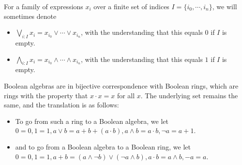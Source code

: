 \begin{remark}
  For a family of expressions $x_i$ over a 
  finite set of indices $I = \{i_0, \cdots, i_n\}$, we will sometimes denote 
  \begin{itemize}
    \item $\bigvee_{i:I} x_i = x_{i_0} \vee \cdots \vee x_{i_n}$,
      with the understanding that this equals $0$ if $I$ is empty. 
    \item $\bigwedge_{i:I} x_i = x_{i_0} \wedge \cdots \wedge x_{i_n}$,
      with the understanding that this equals $1$ if $I$ is empty. 
  \end{itemize}
\end{remark}
\begin{remark}
  Boolean algebras are in bijective correspondence with Boolean rings, which 
  are rings with the property that $x\cdot x = x$ for all $x$. 
  The underlying set remains the same, and the translation is as follows:
  \begin{itemize}
    \item 
      To go from such a ring to a Boolean algebra, we let 
      $0 = 0, 1 =1 ,  a \vee b = a + b + ( a \cdot b), a\wedge b = a \cdot b, \neg a = a + 1$. 
    \item 
      and to go from a Boolean algebra to a Boolean ring, we let 
      $0 = 0, 1 = 1, a + b = (a \wedge \neg  b) \vee ( \neg a \wedge b), a \cdot b = a\wedge b , -a = a$. 
\end{itemize}
\end{remark}

%


